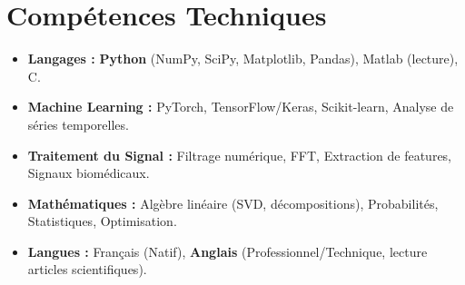 \documentclass[a4paper,11pt]{article}
\begin{document}
\section{Compétences Techniques}
\begin{itemize}[leftmargin=*, nosep]
    \item \small{\textbf{Langages :} \textbf{Python} (NumPy, SciPy, Matplotlib, Pandas), Matlab (lecture), C.}
    \item \small{\textbf{Machine Learning :} PyTorch, TensorFlow/Keras, Scikit-learn, Analyse de séries temporelles.}
    \item \small{\textbf{Traitement du Signal :} Filtrage numérique, FFT, Extraction de features, Signaux biomédicaux.}
    \item \small{\textbf{Mathématiques :} Algèbre linéaire (SVD, décompositions), Probabilités, Statistiques, Optimisation.}
    \item \small{\textbf{Langues :} Français (Natif), \textbf{Anglais} (Professionnel/Technique, lecture articles scientifiques).}
\end{itemize}

\end{document}
